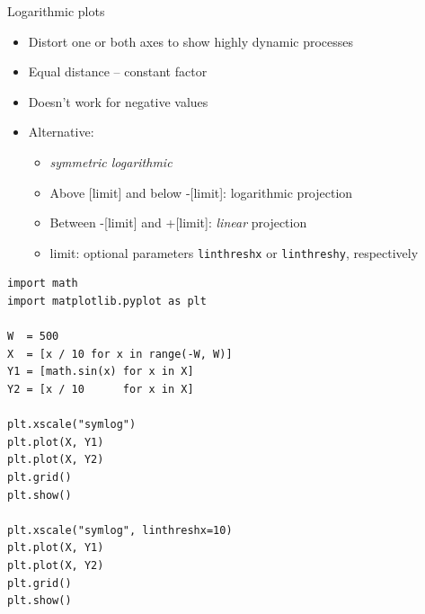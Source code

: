 
\begin{frame}[fragile]{Logarithmic plots}
%
\begin{itemize}
\item Distort one or both axes to show highly dynamic processes
\item Equal distance -- constant factor
\item Doesn't work for negative values
\item Alternative: 
	\begin{itemize}
	\item \emph{symmetric logarithmic}
	\item Above [limit] and below -[limit]: logarithmic projection
	\item Between -[limit] and +[limit]: \emph{linear} projection
	\item limit: optional parameters \texttt{linthreshx} or \texttt{linthreshy}, respectively
	\end{itemize}
\end{itemize}
%
\end{frame}


\begin{frame}[fragile]
%
\begin{codebox}
\begin{verbatim}
import math
import matplotlib.pyplot as plt

W  = 500
X  = [x / 10 for x in range(-W, W)]
Y1 = [math.sin(x) for x in X]
Y2 = [x / 10      for x in X]

plt.xscale("symlog")
plt.plot(X, Y1)
plt.plot(X, Y2)
plt.grid()
plt.show()

plt.xscale("symlog", linthreshx=10)
plt.plot(X, Y1)
plt.plot(X, Y2)
plt.grid()
plt.show()
\end{verbatim}
\end{codebox}
%
\end{frame}


